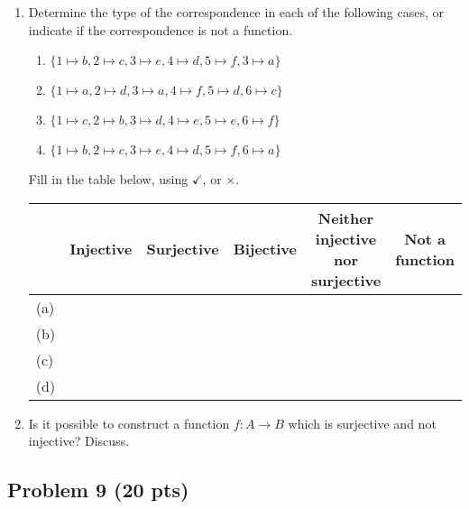 \documentclass[12pt]{article}
\begin{document}
\begin{enumerate}

\item Determine the type of the correspondence in each of the following cases, or indicate if the correspondence is not a function.

\begin{enumerate}
\item $\{ 1 \mapsto b, 2 \mapsto c, 3 \mapsto e, 4 \mapsto d, 5 \mapsto f, 3 \mapsto a \}$

\item $\{ 1 \mapsto a, 2 \mapsto d, 3 \mapsto a, 4 \mapsto f, 5 \mapsto d, 6 \mapsto c \}$

\item $\{ 1 \mapsto c, 2 \mapsto b, 3 \mapsto d, 4 \mapsto e, 5 \mapsto e, 6 \mapsto f  \}$

\item $\{ 1 \mapsto b, 2 \mapsto c, 3 \mapsto e, 4 \mapsto d, 5 \mapsto f, 6 \mapsto a \}$
\end{enumerate}

\noindent Fill in the table below, using $\checkmark$, or $\times$.

\begin{center}
\begin{tabular}{|l|c|c|c|c|c|}
\hline
		& Injective		& Surjective	& Bijective 	& \multicolumn{1}{m{3cm}|}{Neither injective nor surjective}	&	Not a function	\\
\hline
(a)		& 		& 		& 	& 			&  \\
\hline

(b)		& 		& 		& 		& 	&	 \\
\hline


(c)		& 		& 		& 		& 	&  \\
\hline

(d)		& 		& 		& 		&	&  \\
\hline
\end{tabular}
\end{center}


\item Is it possible to construct a function $f : A \rightarrow B$ which is surjective and not injective?  Discuss.
\end{enumerate}

\newpage

\subsection{Problem 9 (20 pts)}
\end{document}
